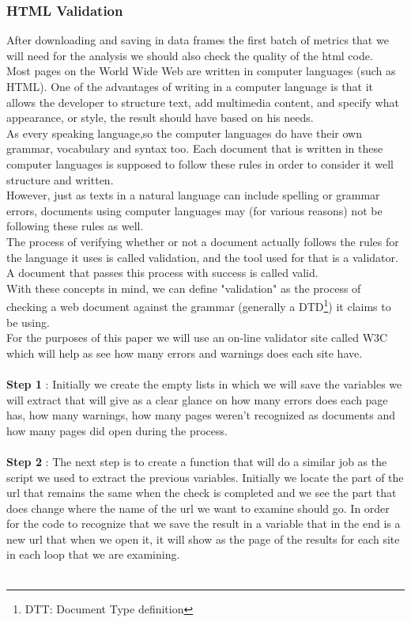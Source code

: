 \documentclass{article}
\begin{document}
\subsubsection{HTML Validation}
After downloading and saving in data frames the first batch of metrics that we will need for the analysis we should also check the quality of the html code.\\
Most pages on the World Wide Web are written in computer languages (such as HTML). One of the advantages of writing in a computer language is that it allows the developer to structure text, add multimedia content, and specify what appearance, or style, the result should have based on his needs.\\
As every speaking language,so the computer languages do have their own grammar, vocabulary and syntax too. Each document that is written in these computer languages is supposed to follow these rules in order to consider it well structure and written.\\
However, just as texts in a natural language can include spelling or grammar errors, documents using computer languages may (for various reasons) not be following these rules as well.\\
The process of verifying whether or not a document actually follows the rules for the language it uses is called validation, and the tool used for that is a validator. A document that passes this process with success is called valid.\\
With these concepts in mind, we can define "validation" as the process of checking a web document against the grammar (generally a DTD\footnote{DTT: Document Type definition}) it claims to be using.\\
For the purposes of this paper we will use an on-line validator site called W3C\cite{key50} which will help as see how many errors and warnings does each site have. \\\\
\textbf{Step 1} : Initially we create the empty lists in which we will save the variables we will extract that will give as a clear glance on how many errors does each page has, how many warnings, how many pages weren't recognized as documents and how many pages did open during the process.\\\\
\textbf{Step 2} : The next step is to create a function that will do a similar job as the script we used to extract the previous variables. Initially we locate the part of the url that remains the same when the check is completed and we see the part that does change where the name of the url we want to examine should go. In order for the code to recognize that we save the result in a variable that in the end is a new url that when we open it, it will show as the page of the results for each site in each loop that we are examining.\\\\
\end{document}
